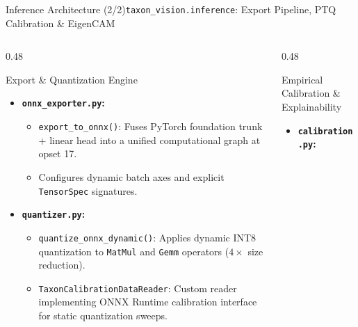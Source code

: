 \begin{frame}{Inference Architecture (2/2)}{\texttt{taxon\_vision.inference}: Export Pipeline, PTQ Calibration \& EigenCAM}
    \begin{columns}[T]
        \begin{column}{0.48\textwidth}
            \begin{block}{Export \& Quantization Engine}
                \begin{itemize}\scriptsize
                    \item \textbf{\texttt{onnx\_exporter.py}:}
                        \begin{itemize}\tiny
                            \item \texttt{export\_to\_onnx()}: Fuses PyTorch foundation trunk + linear head into a unified computational graph at opset 17.
                            \item Configures dynamic batch axes and explicit \texttt{TensorSpec} signatures.
                        \end{itemize}
                    \item \textbf{\texttt{quantizer.py}:}
                        \begin{itemize}\tiny
                            \item \texttt{quantize\_onnx\_dynamic()}: Applies dynamic INT8 quantization to \texttt{MatMul} and \texttt{Gemm} operators ($4\times$ size reduction).
                            \item \texttt{TaxonCalibrationDataReader}: Custom reader implementing ONNX Runtime calibration interface for static quantization sweeps.
                        \end{itemize}
                \end{itemize}
            \end{block}
        \end{column}
        \begin{column}{0.48\textwidth}
            \begin{block}{Empirical Calibration \& Explainability}
                \begin{itemize}\scriptsize
                    \item \textbf{\texttt{calibration.py}:}
                        \begin{itemize}\tiny

\end{itemize}
\end{itemize}
\end{block}
\end{column}
\end{columns}
\end{frame}
